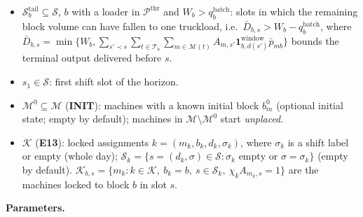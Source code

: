 \begin{itemize}
  every non-terminal pair of systems with a role feeding several roles
  or with several terminal roles, and, in the other systems, the pairs
  whose carried-in state violates
  \(R_{r,b} + \sum_{v\in\pi_{r,b}} \bar{I}_{v,b} \le W_b\)
  (\(\pi_{r,b}\): \(r\) and the non-terminal roles on its path to the
  terminal role). The cap is implied by the other constraints for all
  remaining pairs, and \(\mathcal{P}^{\text{cap}}=\emptyset\) without an
  initial state in linear and joining systems.
\item
  \(\mathcal{S}^{\text{tail}}_b \subseteq \mathcal{S}\), \(b\) with a
  loader in \(\mathcal{P}^{\text{thr}}\) and
  \(W_b > q^{\text{batch}}_b\): slots in which the remaining block
  volume can have fallen to one truckload,
  i.e.~\(\bar{D}_{b,s} > W_b - q^{\text{batch}}_b\), where
  \(\bar{D}_{b,s} = \min\{W_b, \sum_{s'\prec s}\sum_{t\in\mathcal{T}_b}\sum_{m\in\mathcal{M}(t)} A_{m,s'}\mathbf{1}^{\text{window}}_{b,d(s')}\bar{p}_{mb}\}\)
  bounds the terminal output delivered before \(s\).
\item
  \(s_1 \in \mathcal{S}\): first shift slot of the horizon.
\item
  \(\mathcal{M}^{0} \subseteq \mathcal{M}\) (\textbf{INIT}): machines
  with a known initial block \(b^{0}_m\) (optional initial state; empty
  by default); machines in \(\mathcal{M}\setminus\mathcal{M}^{0}\) start
  \emph{unplaced}.
\item
  \(\mathcal{K}\) (\textbf{E13}): locked assignments
  \(k=(m_k,b_k,d_k,\sigma_k)\), where \(\sigma_k\) is a shift label or
  empty (whole day);
  \(\mathcal{S}_k = \{s=(d_k,\sigma) \in \mathcal{S} : \sigma_k \text{ empty or } \sigma=\sigma_k\}\)
  (empty by default).
  \(\mathcal{K}_{b,s} = \{m_k: k\in\mathcal{K},\ b_k=b,\ s\in\mathcal{S}_k,\ \chi_k A_{m_k,s}=1\}\)
  are the machines locked to block \(b\) in slot \(s\).
\end{itemize}

\textbf{Parameters.}

